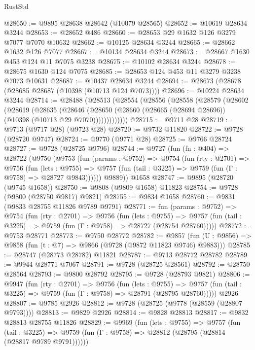 \begin{lexlean}{RustStd}
\begin{coremodule}
{\begin{coremodule}
{{{{{{{{{{{{{{{{{{{{{{{{{{@28650 := @9895 @28638 @28642 (@10079 @28565)
@28652 := @10619 @28634 @3244
@28653 := @28652 @486
@28660 := @28653 @29 @1632 @126 @3279 @7077 @7070 @10632
@28662 := @10125 @28634 @3244
@28665 := @28662 @1632 @126 @7077
@28667 := @10134 @28634 @3244
@28673 := @28667 @1630 @453 @124 @11 @7075 @3238
@28675 := @10102 @28634 @3244
@28678 := @28675 @1630 @124 @7075
@28685 := @28653 @124 @453 @11 @3279 @3238 @7073 @10631
@28687 := @10437 @28634 @3244
@28694 := @28673 (@28678 (@28685 @28687 (@10398 (@10713 @124 @7073))))
@28696 := @10224 @28634 @3244
@28714 := @28488
    (@28513
      (@28554
        (@28556
          (@28558
            (@28579
              (@28602
                (@28619
                  (@28635
                    (@28646
                      (@28650
                        (@28660 (@28665 (@28694 @28696)) (@10398 (@10713 @29 @7070)))))))))))))
@28715 := @9711 @28
@28719 := @9713 (@9717 @28) (@9723 @28)
@28720 := @9732 @11820
@28722 := @9728 (@28720 @9747)
@28724 := @9770 (@9771 @28)
@28725 := @9766 @28724
@28727 := @9728 (@28725 @9796)
@28744 := @9727
    (fun (fn : @404) =>
    @28722
      (@9750
        (@9753
          (fun (params : @9752) =>
          @9754
            (fun (rty : @2701) =>
            @9756
              (fun (lets : @9755) =>
              @9757 (fun (tail : @3225) => @9759 (fun (Γ : @9758) => @28727 @9843))))))
        @9889))
    @1658
@28747 := @9895 (@28720 (@9745 @1658))
@28750 := @9808 (@9809 @1658) @11823
@28754 := @9728 (@9800 (@28750 @9817) @9821)
@28755 := @9834 @1658
@28760 := @9831 (@9833 @28755 @11826 @9789 @9791)
@28771 := fun (params : @9752) =>
  @9754
    (fun (rty : @2701) =>
    @9756
      (fun (lets : @9755) =>
      @9757 (fun (tail : @3225) => @9759 (fun (Γ : @9758) => @28727 (@28754 @28760)))))
@28772 := @9753 @28771
@28773 := @9750 @28772
@28782 := @9857
    (fun (U : @9856) => @9858 (fun (t : @7) => @9866 (@9728 (@9872 @11823 @9746) @9883)))
@28785 := @28747 (@28773 @28782) @11821
@28787 := @9713 @28772 @28782
@28789 := @9944 @28771 @7067
@28791 := @9728 (@28725 @28561)
@28792 := @28750 @28564
@28793 := @9800 @28792
@28795 := @9728 (@28793 @9821)
@28806 := @9947
    (fun (rty : @2701) =>
    @9756
      (fun (lets : @9755) =>
      @9757 (fun (tail : @3225) => @9759 (fun (Γ : @9758) => @28791 (@28795 @28760)))))
    @2926
@28807 := @9785 @2926
@28812 := @9728 (@28725 (@9778 (@28559 (@28807 @9793))))
@28813 := @9829 @2926
@28814 := @9828 @28813
@28817 := @9832 @28813 @28755 @11826
@28829 := @9969
    (fun (lets : @9755) =>
    @9757
      (fun (tail : @3225) =>
      @9759 (fun (Γ : @9758) => @28812 (@28795 (@28814 (@28817 @9789 @9791))))))
}}}}}}}}}}}}}}}}}}}}}}}}}}
\end{coremodule}}
\end{coremodule}
\end{lexlean}
